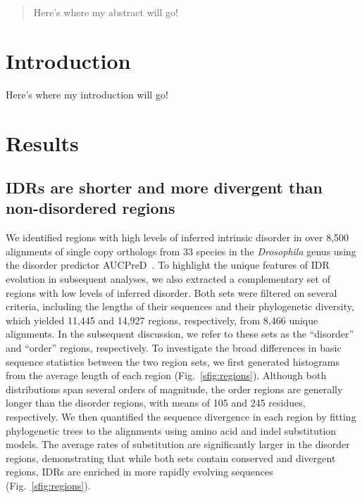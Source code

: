 \begin{abstract}
\noindent
Here's where my abstract will go!
\end{abstract}

\section{Introduction}
Here's where my introduction will go!

\section{Results}
\subsection{IDRs are shorter and more divergent than non-disordered regions}
We identified regions with high levels of inferred intrinsic disorder in over 8,500 alignments of single copy orthologs from 33 species in the \textit{Drosophila} genus using the disorder predictor AUCPreD~\cite{Wang2016}. To highlight the unique features of IDR evolution in subsequent analyses, we also extracted a complementary set of regions with low levels of inferred disorder. Both sets were filtered on several criteria, including the lengths of their sequences and their phylogenetic diversity, which yielded 11,445 and 14,927 regions, respectively, from 8,466 unique alignments. In the subsequent discussion, we refer to these sets as the ``disorder'' and ``order'' regions, respectively. To investigate the broad differences in basic sequence statistics between the two region sets, we first generated histograms from the average length of each region (Fig.~\ref{sfig:regions}). Although both distributions span several orders of magnitude, the order regions are generally longer than the disorder regions, with means of 105 and 245 residues, respectively. We then quantified the sequence divergence in each region by fitting phylogenetic trees to the alignments using amino acid and indel substitution models. The average rates of substitution are significantly larger in the disorder regions, demonstrating that while both sets contain conserved and divergent regions, IDRs are enriched in more rapidly evolving sequences (Fig.~\ref{sfig:regions}).
%
